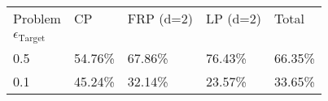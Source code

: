 \begin{tabular}{lllll}
Problem & CP & FRP (d=2) & LP (d=2) & Total \\
$\epsilon_{{\text{{Target}}}}$ &  &  &  &  \\
0.5 & 54.76\% & 67.86\% & 76.43\% & 66.35\% \\
\cline{1-5}
0.1 & 45.24\% & 32.14\% & 23.57\% & 33.65\% \\
\cline{1-5}
\end{tabular}
